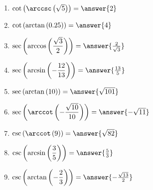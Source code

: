 \documentclass{ximera}
\begin{document}
\begin{exercise}
\begin{enumerate}
\item  $\cot\left(\arccsc\left(\sqrt{5}\right)\right)=\answer{2}$ 
\item  $\cot\left(\arctan \left( 0.25 \right)\right)=\answer{4}$ 
\item  $\sec\left(\arccos\left(\dfrac{\sqrt{3}}{2}\right)\right)=\answer{\frac{2}{\sqrt{3}}}$
\item  $\sec\left(\arcsin\left(-\dfrac{12}{13}\right)\right)=\answer{\frac{13}{5}}$ 
\item  $\sec\left(\arctan\left(10\right)\right)=\answer{\sqrt{101}}$ 
\item  $\sec\left(\arccot\left(-\dfrac{\sqrt{10}}{10}\right)\right)=\answer{-\sqrt{11}}$
\item  $\csc\left(\arccot\left(9 \right)\right)=\answer{\sqrt{82}}$ 
\item  $\csc\left(\arcsin\left(\dfrac{3}{5}\right)\right)=\answer{\frac{5}{3}}$
\item  $\csc\left(\arctan\left(-\dfrac{2}{3}\right)\right)=\answer{-\frac{\sqrt{13}}{2}}$ \label{stillmoreexactlast}
\end{enumerate}


\end{exercise}
\end{document}
